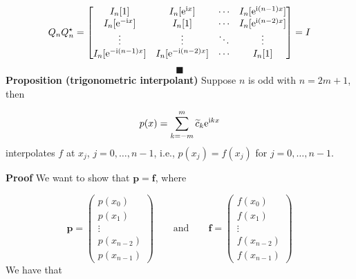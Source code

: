 \documentclass[12pt,a4paper]{article}
\begin{document}
\[
Q_n Q_n^\ensuremath{\star}  = \begin{bmatrix} I_n[1] & I_n[{\rm e}^{{\rm i} x}] & \ensuremath{\cdots} & I_n[{\rm e}^{{\rm i} (n-1) x}] \\
                            I_n[{\rm e}^{-{\rm i} x}] & I_n[1] & \ensuremath{\cdots} & I_n[{\rm e}^{{\rm i} (n-2) x}] \\
                            \ensuremath{\vdots} & \ensuremath{\vdots} & \ensuremath{\ddots} & \ensuremath{\vdots} \\
                            I_n[{\rm e}^{-{\rm i}(n-1) x}] & I_n[{\rm e}^{-{\rm i}(n-2) x}] & \ensuremath{\cdots} & I_n[1]
                            \end{bmatrix} = I
\]
\[
\blacksquare
\]
\textbf{Proposition (trigonometric interpolant)} Suppose $n$ is odd with $n = 2m+1$, then 

\[
p(x) = \sum_{k=-m}^{m}\widetilde{c}_{k}{\rm e}^{{\rm i}kx}
\]
interpolates $f$ at $x_j$, $j = 0, \ldots, n-1$, i.e., $p(x_j) = f(x_j)$ for $j = 0, \ldots, n-1$.

\textbf{Proof}  We want to show that $\mathbf{p} = \mathbf{f}$, where 

\[
\mathbf{p} = \left(
\begin{array}{c}
p(x_0) \\
p(x_1) \\
\vdots \\
p(x_{n-2}) \\
p(x_{n-1})
\end{array}
\right) \qquad \text{and} \qquad 
\mathbf{f} = \left(
\begin{array}{c}
f(x_0) \\
f(x_1) \\
\vdots \\
f(x_{n-2}) \\
f(x_{n-1})
\end{array}
\right)
\]
We have that
\end{document}
